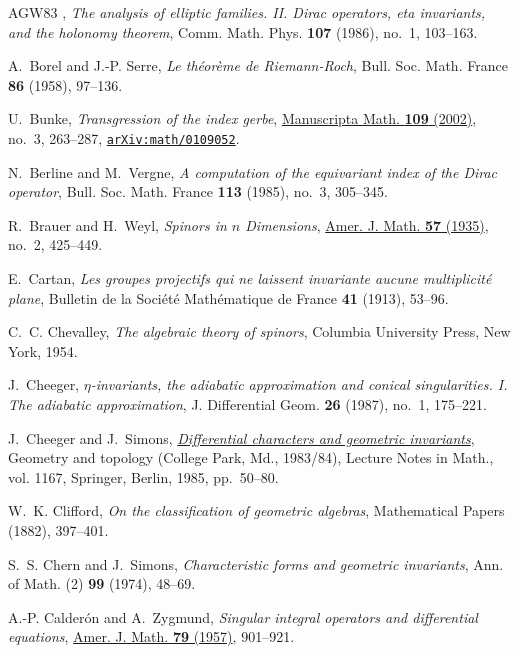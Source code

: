 \documentclass[11pt]{amsart}
\theoremstyle{definition}
\theoremstyle{remark}
\theoremstyle{plain}
\numberwithin{equation}{section}
\renewcommand{\:}{\colon}
\begin{document}
\begin{thebibliography}{AGW83}
\bysame, \emph{The analysis of elliptic families. {II}. {D}irac operators, eta
  invariants, and the holonomy theorem}, Comm. Math. Phys. \textbf{107} (1986),
  no.~1, 103--163.

A.~Borel and J.-P. Serre, \emph{Le th\'eor\`eme de Riemann-Roch}, Bull. Soc.
  Math. France \textbf{86} (1958), 97--136.

U.~Bunke, \emph{Transgression of the index gerbe},
  \href{http://dx.doi.org/10.1007/s00229-002-0314-8}{Manuscripta Math.
  \textbf{109} (2002)}, no.~3, 263--287,
  \href{http://arxiv.org/abs/arXiv:math/0109052}{{\tt arXiv:math/0109052}}.

N.~Berline and M.~Vergne, \emph{A computation of the equivariant index of the
  {D}irac operator}, Bull. Soc. Math. France \textbf{113} (1985), no.~3,
  305--345.

R.~Brauer and H.~Weyl, \emph{Spinors in {$n$} {D}imensions},
  \href{http://dx.doi.org/10.2307/2371218}{Amer. J. Math. \textbf{57} (1935)},
  no.~2, 425--449.

E.~Cartan, \emph{Les groupes projectifs qui ne laissent invariante aucune
  multiplicit{\'e} plane}, Bulletin de la Soci{\'e}t{\'e} Math{\'e}matique de
  France \textbf{41} (1913), 53--96.

C.~C. Chevalley, \emph{The algebraic theory of spinors}, Columbia University
  Press, New York, 1954.

J.~Cheeger, \emph{{$\eta$}-invariants, the adiabatic approximation and conical
  singularities. {I}. {T}he adiabatic approximation}, J. Differential Geom.
  \textbf{26} (1987), no.~1, 175--221.

J.~Cheeger and J.~Simons,
  \href{http://dx.doi.org/10.1007/BFb0075216}{\emph{Differential characters and
  geometric invariants}}, Geometry and topology ({C}ollege {P}ark, {M}d.,
  1983/84), Lecture Notes in Math., vol. 1167, Springer, Berlin, 1985,
  pp.~50--80.

W.~K. Clifford, \emph{On the classification of geometric algebras},
  Mathematical Papers (1882), 397--401.

S.~S. Chern and J.~Simons, \emph{Characteristic forms and geometric
  invariants}, Ann. of Math. (2) \textbf{99} (1974), 48--69.

A.-P. Calder\'{o}n and A.~Zygmund, \emph{Singular integral operators and
  differential equations}, \href{http://dx.doi.org/10.2307/2372441}{Amer. J.
  Math. \textbf{79} (1957)}, 901--921.


\end{thebibliography}
\end{document}
